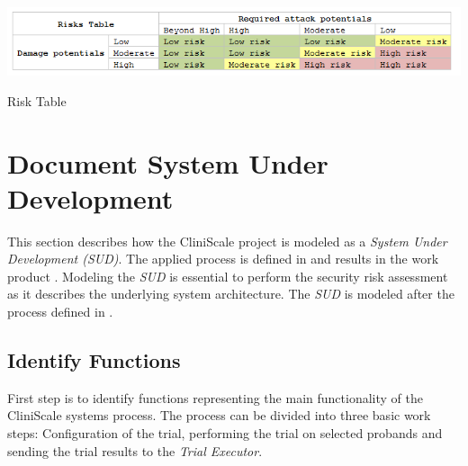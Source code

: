 	\begin{table}[H]%
		\centering
		\includegraphics[width=\linewidth]{images/risktable.PNG} %
		\caption{Risk Table}
        \label{tbl:risktable}
	\end{table}

\section{Document System Under Development}
\label{archdesign}
This section describes how the CliniScale project is modeled as a \textit{System Under Development (\textit{SUD})}. The applied process is defined in \textit{} and results in the work product \textit{}. Modeling the \textit{SUD} is essential to perform the security risk assessment as it describes the underlying system architecture. The \textit{SUD} is modeled after the process defined in \textit{}.


\subsection{Identify Functions}
\label{designIdFunc}

First step is to identify functions representing the main functionality of the CliniScale systems process. The process can be divided into three basic work steps: Configuration of the trial, performing the trial on selected probands and sending the trial results to the \textit{Trial Executor}. 

